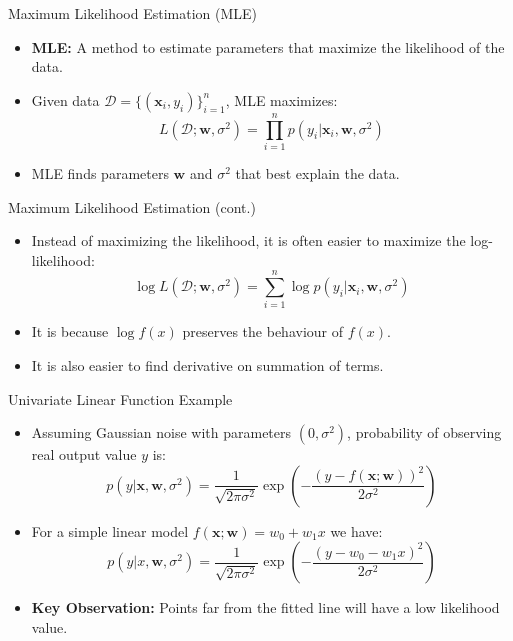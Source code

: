\documentclass[serif, aspectratio=169]{beamer}
\begin{document}
\begin{frame}{Maximum Likelihood Estimation (MLE)}
    \begin{itemize}
        \item \textbf{MLE:} A method to estimate parameters that maximize the likelihood of the data.
        \item Given data \( \mathcal{D} = \{ (\mathbf{x}_i, y_i) \}_{i=1}^n \), MLE maximizes:
        \[
        L(\mathcal{D}; \mathbf{w}, \sigma^2) = \prod_{i=1}^n p(y_i | \mathbf{x}_i, \mathbf{w}, \sigma^2)
        \]
        \item MLE finds parameters \( \mathbf{w} \) and \( \sigma^2 \) that best explain the data.
    \end{itemize}
\end{frame}

\begin{frame}{Maximum Likelihood Estimation (cont.)}
    \begin{itemize}
        \item Instead of maximizing the likelihood, it is often easier to maximize the log-likelihood:
        \[
        \log L(\mathcal{D}; \mathbf{w}, \sigma^2) = \sum_{i=1}^n \log  p(y_i | \mathbf{x}_i, \mathbf{w}, \sigma^2)
        \]
        \item It is because \( \log f(x) \) preserves the behaviour of \( f(x) \).
        \item It is also easier to find derivative on summation of terms.
    \end{itemize}
\end{frame}

\begin{frame}{Univariate Linear Function Example}
    \begin{itemize}
        \item Assuming Gaussian noise with parameters \( (0, \sigma^2) \), probability of observing real output value \( y \) is:
        \[
        p(y | \mathbf{x}, \mathbf{w}, \sigma^2) = \frac{1}{\sqrt{2\pi \sigma^2}} \exp \left( - \frac{(y - f(\mathbf{x}; \mathbf{w}))^2}{2\sigma^2} \right)
        \]

        \item For a simple linear model \( f(\mathbf{x}; \mathbf{w}) = w_0 + w_1 x \) we have:
        \[
        p(y | x, \mathbf{w}, \sigma^2) = \frac{1}{\sqrt{2\pi \sigma^2}} \exp \left( - \frac{(y - w_0 - w_1 x)^2}{2\sigma^2} \right)
        \]
        \item \textbf{Key Observation:} Points far from the fitted line will have a low likelihood value.
    \end{itemize}
\end{frame}
\end{document}
